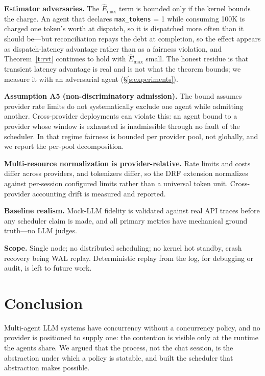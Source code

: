 \documentclass[letterpaper,11pt,leqno]{article}
\begin{document}
\textbf{Estimator adversaries.} The $\hat{E}_{\max}$ term is bounded only if the kernel bounds the charge. An agent that declares \texttt{max\_tokens} = 1 while consuming 100K is charged one token's worth at dispatch, so it is dispatched more often than it should be---but reconciliation repays the debt at completion, so the effect appears as dispatch-latency advantage rather than as a fairness violation, and Theorem~\ref{t:rvt} continues to hold with $\hat{E}_{\max}$ small. The honest residue is that transient latency advantage is real and is not what the theorem bounds; we measure it with an adversarial agent (\S\ref{s:experiments}).

\textbf{Assumption A5 (non-discriminatory admission).} The bound assumes provider rate limits do not systematically exclude one agent while admitting another. Cross-provider deployments can violate this: an agent bound to a provider whose window is exhausted is inadmissible through no fault of the scheduler. In that regime fairness is bounded per provider pool, not globally, and we report the per-pool decomposition.

\textbf{Multi-resource normalization is provider-relative.} Rate limits and costs differ across providers, and tokenizers differ, so the DRF extension normalizes against per-session configured limits rather than a universal token unit. Cross-provider accounting drift is measured and reported.

\textbf{Baseline realism.} Mock-LLM fidelity is validated against real API traces before any scheduler claim is made, and all primary metrics have mechanical ground truth---no LLM judges.

\textbf{Scope.} Single node; no distributed scheduling; no kernel hot standby, crash recovery being WAL replay. Deterministic replay from the log, for debugging or audit, is left to future work.

\section{Conclusion}\label{s:ccl}

Multi-agent LLM systems have concurrency without a concurrency policy, and no provider is positioned to supply one: the contention is visible only at the runtime the agents share. We argued that the process, not the chat session, is the abstraction under which a policy is statable, and built the scheduler that abstraction makes possible.
\end{document}
